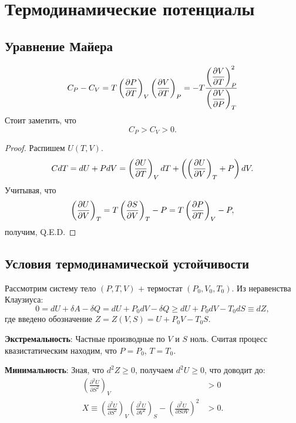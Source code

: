 \section{Термодинамические потенциалы}

\subsection{Уравнение Майера}
\begin{equation}
\label{cp-cv}
    C_P - C_V = T \left(\dfrac{\partial {P}}{\partial {T}} \right)_{V} \left(\dfrac{\partial {V}}{\partial {T}} \right)_{P} = - T \frac{\left(\dfrac{\partial {V}}{\partial {T}} \right)_{P}^2}{\left(\dfrac{\partial {V}}{\partial {P}} \right)_{T}}
\end{equation}
Стоит заметить, что 
\begin{equation}
    C_P > C_V > 0.
\end{equation}

\begin{proof}
Распишем $U(T, V)$. 
    \begin{equation*}
    C dT = dU + PdV = \left(\dfrac{\partial {U}}{\partial {T}} \right)_{V}dT + \left(
    \left(\dfrac{\partial {U}}{\partial {V}} \right)_{T} + P
    \right) dV.
\end{equation*}
Учитывая, что
\begin{equation}
\label{derU}
    \left(\dfrac{\partial {U}}{\partial {V}} \right)_{T} = T \left(\dfrac{\partial {S}}{\partial {V}} \right)_{T} - P = T \left(\dfrac{\partial {P}}{\partial {T}} \right)_{V} - P,
\end{equation}
получим, Q.E.D.
\end{proof}



\subsection{Условия термодинамической устойчивости}
Рассмотрим систему тело $\left(P, T, V \right)$ $+$ термостат $\left( P_0, V_0, T_0 \right)$. Из неравенства Клаузиуса:
$$
0 = dU + \delta A - \delta Q = dU + P_0 dV - \delta Q  \geqslant dU + P_0 dV - T_0 dS \equiv dZ,
$$
где введено обозначение $Z = Z(V, S) = U + P_0 V - T_0 S$.

\phantom{42}

\noindent
\textbf{Экстремальность}:  Частные производные по $V$ и $S$ ноль. Считая процесс квазистатическим находим, что $P=P_0$, $T = T_0$. 

\phantom{42}

\noindent
\textbf{Минимальность}: Зная, что $d^2 Z \geqslant 0$, получаем $d^2 U \geqslant 0$, что доводит до:
\begin{align}
\label{a}
    \left( \frac{ 
    \partial^2 U
    }{
    \partial S^2
    } \right)_{V} &> 0 \\
    X \equiv
    \label{b}
    \left( \frac{ 
    \partial^2 U
    }{
    \partial S^2
    } \right)_{V}
    \left( \frac{ 
    \partial^2 U
    }{
    \partial V^2
    } \right)_{S} -
    \left( \frac{ 
    \partial^2 U
    }{
    \partial S \partial V
    } \right)^2 &> 0.
\end{align}

